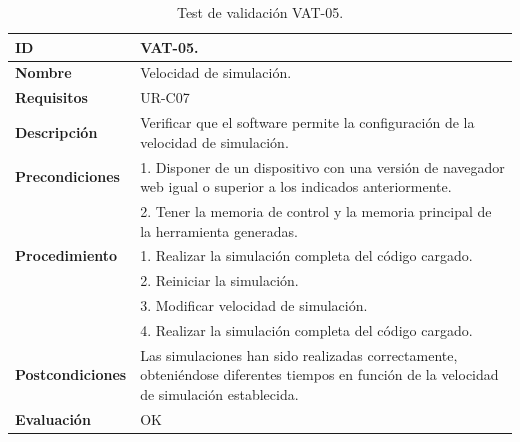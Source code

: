 \begin{center}
\begin{table}[htb]
\centering
\caption{Test de validación VAT-05.}
\begin{tabular}{@{}p{2.5cm} p{9cm}@{}} 
\toprule
\textbf{ID} 					& VAT-05. \\
\midrule
\textbf{Nombre} 				& Velocidad de simulación. \\
\midrule
\textbf{Requisitos} 		& UR-C07\\
\midrule
\textbf{Descripción} 		& Verificar que el software permite la configuración de la velocidad de simulación. \\
\midrule
\textbf{Precondiciones}		& 1. Disponer de un dispositivo con una versión de navegador web igual o superior a los indicados anteriormente. \\
											& 2. Tener la memoria de control y la memoria principal de la herramienta generadas. \\
\midrule
\textbf{Procedimiento}		& 1. Realizar la simulación completa del código cargado.\\
											& 2. Reiniciar la simulación.\\
											& 3. Modificar velocidad de simulación. \\
											& 4. Realizar la simulación completa del código cargado.\\
\midrule
\textbf{Postcondiciones} 		&  Las simulaciones han sido realizadas correctamente, obteniéndose diferentes tiempos en función de la velocidad de simulación establecida.\\
\midrule
\textbf{Evaluación} 			& OK \\
\bottomrule
\end{tabular}
\label{tab:vat-05}
\end{table}
\end{center}

